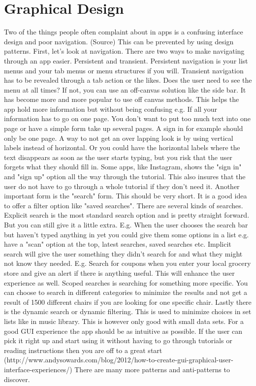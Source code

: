 \section{Graphical Design}
Two of the things people often complaint about in apps is a confusing interface design and poor navigation. (Source) This can be prevented by using design patterns. 
First, let's look at navigation. There are two ways to make navigating through an app easier. Persistent and transient. Persistent navigation is your list menus and your tab menus or menu structures if you will. Transient navigation has to be revealed through a tab action or the likes. 
Does the user need to see the menu at all times? If not, you can use an off-canvas solution like the side bar. 
It has become more and more popular to use off canvas methods. This helps the app hold more information but without being confusing e.g. If all your information has to go on one page. 
You don't want to put too much text into one page or have a simple form take up several pages. A sign in for example should only be one page. A way to not get an over lapping look is by using vertical labels instead of horizontal. Or you could have the horizontal labels where the text disappears as soon as the user starts typing, but you risk that the user forgets what they should fill in. 
Some apps, like Instagram, shows the "sign in" and "sign up" option all the way through the tutorial. This also insures that the user do not have to go through a whole tutorial if they don’t need it. 
Another important form is the "search" form. This should be very short. It is a good idea to offer a filter option like "saved searches". There are several kinds of searches. Explicit search is the most standard search option and is pretty straight forward. But you can still give it a little extra. E.g. When the user chooses the search bar but haven't typed anything in yet you could give them some options in a list e.g. have a "scan" option at the top, latest searches, saved searches etc. 
Implicit search will give the user something they didn't search for and what they might not know they needed. E.g. Search for coupons when you enter your local grocery store and give an alert if there is anything useful. This will enhance the user experience as well. 
Scoped searches is searching for something more specific. You can choose to search in different categories to minimize the results and not get a result of 1500 different chairs if you are looking for one specific chair. 
Lastly there is the dynamic search or dynamic filtering. This is used to minimize choices in set lists like in music library. This is however only good with small data sets.
For a good GUI experience the app should be as intuitive as possible. If the user can pick it right up and start using it without having to go through tutorials or reading instructions then you are off to a great start (http://www.andysowards.com/blog/2012/how-to-create-gui-graphical-user-interface-experiences/)
There are many more patterns and anti-patterns to discover.  
